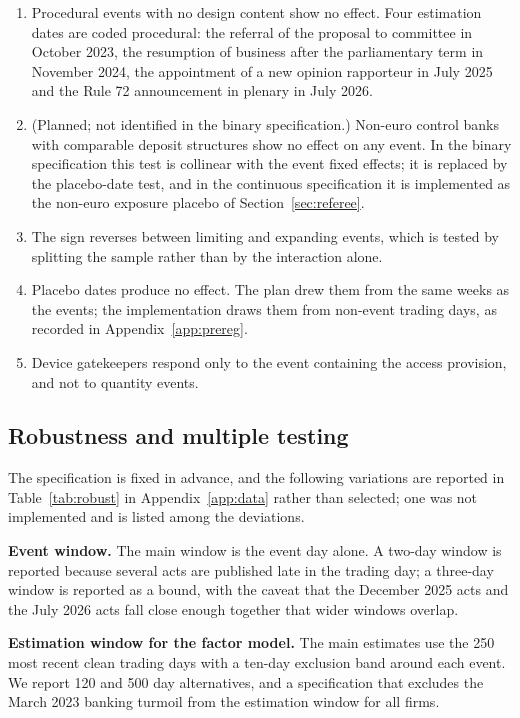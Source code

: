 \documentclass[11pt]{article}
\theoremstyle{plain}\newtheorem{proposition}{Proposition}
\begin{document}
\begin{enumerate}\itemsep2pt
\item[F1] Procedural events with no design content show no effect. Four estimation dates are coded procedural: the referral of the proposal to committee in October 2023, the resumption of business after the parliamentary term in November 2024, the appointment of a new opinion rapporteur in July 2025 and the Rule 72 announcement in plenary in July 2026.
\item[F2] (Planned; not identified in the binary specification.) Non-euro control banks with comparable deposit structures show no effect on any event. In the binary specification this test is collinear with the event fixed effects; it is replaced by the placebo-date test, and in the continuous specification it is implemented as the non-euro exposure placebo of Section~\ref{sec:referee}.
\item[F3] The sign reverses between limiting and expanding events, which is tested by splitting the sample rather than by the interaction alone.
\item[F4] Placebo dates produce no effect. The plan drew them from the same weeks as the events; the implementation draws them from non-event trading days, as recorded in Appendix~\ref{app:prereg}.
\item[F5] Device gatekeepers respond only to the event containing the access provision, and not to quantity events.
\end{enumerate}

\subsection{Robustness and multiple testing}\label{sec:robust}

The specification is fixed in advance, and the following variations are reported in Table~\ref{tab:robust} in Appendix~\ref{app:data} rather than selected; one was not implemented and is listed among the deviations.

\textbf{Event window.} The main window is the event day alone. A two-day window is reported because several acts are published late in the trading day; a three-day window is reported as a bound, with the caveat that the December 2025 acts and the July 2026 acts fall close enough together that wider windows overlap.

\textbf{Estimation window for the factor model.} The main estimates use the 250 most recent clean trading days with a ten-day exclusion band around each event. We report 120 and 500 day alternatives, and a specification that excludes the March 2023 banking turmoil from the estimation window for all firms.
\end{document}
